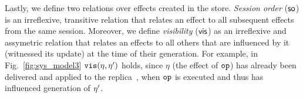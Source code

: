 Lastly, we define two relations over effects created in the store.
\emph{Session order} (${\textsf{so}}$) is an irreflexive, transitive relation that relates
an effect to all subsequent effects from the same session.
Moreover, we define 
\emph{visibility} (${{\normalfont \textsf{vis}}}$) 
as an irreflexive and assymetric relation that 
relates an effects to all others that are influenced by it (witnessed its
update) at the time of their generation.
For example, in Fig.~\ref{fig:sys_model3} ${\normalfont \texttt{vis}}
(\eta,\eta')$ holds, since $\eta$ (the effect of ${\normalfont \texttt{op}}$) has already been
delivered and applied to the replica~, when ${\normalfont \texttt{op}}$ is executed and thus has influenced 
generation of $\eta'$.
















































































